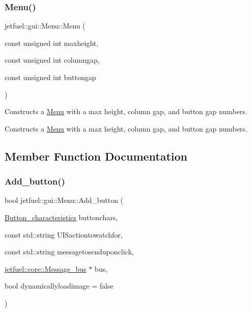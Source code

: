 \subsubsection{\texorpdfstring{Menu()}{Menu()}\hspace{0.1cm}{\footnotesize\ttfamily [2/2]}}
{\footnotesize\ttfamily jetfuel\+::gui\+::\+Menu\+::\+Menu (\begin{DoxyParamCaption}\item[{const unsigned int}]{maxheight,  }\item[{const unsigned int}]{columngap,  }\item[{const unsigned int}]{buttongap }\end{DoxyParamCaption})\hspace{0.3cm}{\ttfamily [inline]}}



Constructs a \hyperlink{classjetfuel_1_1gui_1_1Menu}{Menu} with a max height, column gap, and button gap numbers. 

Constructs a \hyperlink{classjetfuel_1_1gui_1_1Menu}{Menu} with a max height, column gap, and button gap numbers. 

\subsection{Member Function Documentation}
\mbox{\label{classjetfuel_1_1gui_1_1Menu_a6f0162b01dbf0bd6bf65cfb3712499fc}} 
\subsubsection{\texorpdfstring{Add\+\_\+button()}{Add\_button()}}
{\footnotesize\ttfamily bool jetfuel\+::gui\+::\+Menu\+::\+Add\+\_\+button (\begin{DoxyParamCaption}\item[{\hyperlink{structjetfuel_1_1gui_1_1Menu_1_1Button__characteristics}{Button\+\_\+characteristics}}]{buttonchars,  }\item[{const std\+::string}]{U\+I\+Sactiontowatchfor,  }\item[{const std\+::string}]{messagetosenduponclick,  }\item[{\hyperlink{classjetfuel_1_1core_1_1Message__bus}{jetfuel\+::core\+::\+Message\+\_\+bus} $\ast$}]{bus,  }\item[{bool}]{dynamicallyloadimage = {\ttfamily false} }\end{DoxyParamCaption})}



